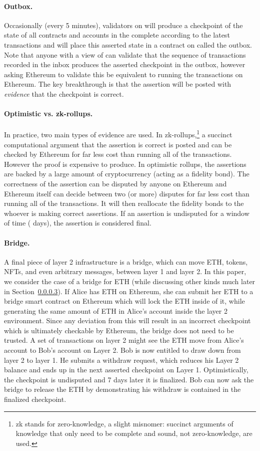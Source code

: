 \paragraph{Outbox.} Occasionally (\eg every 5 minutes), validators on \layertwo will produce a checkpoint of the state of all contracts and accounts in the complete \layertwo according to the latest transactions and will place this asserted state in a contract on \layerone called the outbox. Note that anyone with a view of \layerone can validate that the sequence of transactions recorded in the inbox produces the asserted checkpoint in the outbox, however asking Ethereum to validate this be equivalent to running the transactions on Ethereum. The key breakthrough is that the assertion will be posted with \textit{evidence} that the checkpoint is correct.

\paragraph{Optimistic vs. zk-rollups.} In practice, two main types of evidence are used. In zk-rollups,\footnote{zk stands for zero-knowledge, a slight misnomer: succinct arguments of knowledge that only need to be complete and sound, not zero-knowledge, are used.} a succinct computational argument that the assertion is correct is posted and can be checked by Ethereum for far less cost than running all of the transactions. However the proof is expensive to produce. In optimistic rollups, the assertions are backed by a large amount of cryptocurrency (acting as a fidelity bond). The correctness of the assertion can be disputed by anyone on Ethereum and Ethereum itself can decide between two (or more) disputes for far less cost than running all of the transactions. It will then reallocate the fidelity bonds to the whoever is making correct assertions. If an assertion is undisputed for a window of time ( days), the assertion is considered final.

\paragraph{Bridge.} A final piece of layer 2 infrastructure is a bridge, which can move ETH, tokens, NFTs, and even arbitrary messages, between layer 1 and layer 2. In this paper, we consider the case of a bridge for ETH (while discussing other kinds much later in Section~\ref{}). If Alice has ETH on Ethereum, she can submit her ETH to a bridge smart contract on Ethereum which will lock the ETH inside of it, while generating the same amount of ETH in Alice's account inside the layer 2 environment. Since any deviation from this will result in  an incorrect checkpoint which is ultimately checkable by Ethereum, the bridge does not need to be trusted. A set of transactions on layer 2 might see the ETH move from Alice's account to Bob's account on Layer 2. Bob is now entitled to draw down from layer 2 to layer 1. He submits a withdraw request, which reduces his Layer 2 balance and ends up in the next asserted checkpoint on Layer 1. Optimistically, the checkpoint is undisputed and 7 days later it is finalized. Bob can now ask the bridge to release the ETH by demonstrating his withdraw is contained in the finalized checkpoint.

